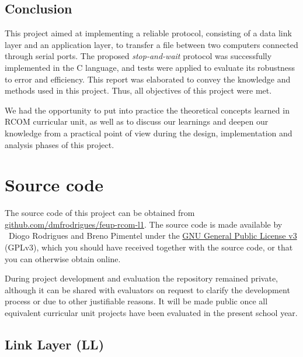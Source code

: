 \documentclass[a4paper, 11pt]{report}
\begin{document}
\section{Conclusion} \label{sec:Conclusion}

This project aimed at implementing a reliable protocol, consisting of a data link layer and an application layer, to transfer a file between two computers connected through serial ports. The proposed \textit{stop-and-wait} protocol was successfully implemented in the C language, and tests were applied to evaluate its robustness to error and efficiency. This report was elaborated to convey the knowledge and methods used in this project.
Thus, all objectives of this project were met.

We had the opportunity to put into practice the theoretical concepts learned in RCOM curricular unit, as well as to discuss our learnings and deepen our knowledge from a practical point of view during the design, implementation and analysis phases of this project.

\appendix
\appendixpage
\addappheadtotoc
\chapter{Source code}

The source code of this project can be obtained from \href{https://github.com/dmfrodrigues/feup-rcom-l1}{github.com/dmfrodrigues/feup-rcom-l1}. The source code is made available by \textcopyright~Diogo Rodrigues and Breno Pimentel under the \href{https://www.gnu.org/licenses/gpl-3.0.en.html}{GNU General Public License v3} (GPLv3), which you should have received together with the source code, or that you can otherwise obtain online.

During project development and evaluation the repository remained private, although it can be shared with evaluators on request to clarify the development process or due to other justifiable reasons. It will be made public once all equivalent curricular unit projects have been evaluated in the present school year.

\fancyhfoffset{0pt}

\section{Link Layer (LL)}


\end{document}

